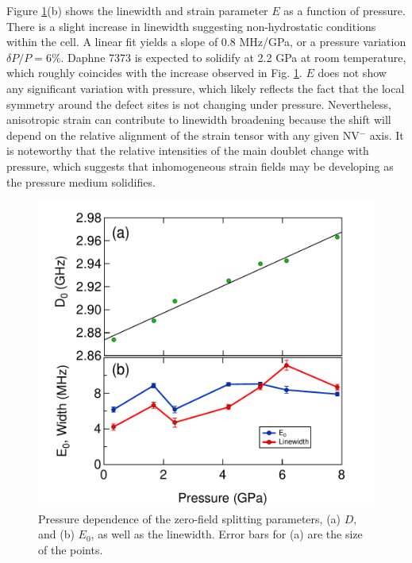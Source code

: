 \documentclass[%
 aip,
 sd,%
 amsmath,amssymb,
 reprint,%
 longbibliography
]{revtex4-1}
\begin{document}
Figure \ref{fig:parsVSpressure}(b) shows the linewidth and strain parameter $E$ as a function of pressure.  There is a slight increase in linewidth suggesting non-hydrostatic conditions within the cell.  A linear fit  yields a slope of 0.8 MHz/GPa, or a pressure variation $\delta P/P = 6\%$.     Daphne 7373 is expected to solidify at 2.2 GPa at room temperature, which roughly coincides with the increase observed in Fig. \ref{fig:parsVSpressure}.\cite{DaphneOilHighPressure}  $E$ does not show any significant variation with pressure, which likely reflects the fact that the local symmetry around the defect sites is not changing under pressure.\cite{NVcenterGroupTheoryAnalysis} Nevertheless, anisotropic strain  can contribute to linewidth broadening  because the shift will depend on the relative alignment of the strain tensor with any given NV$^-$ axis.  It is noteworthy that the relative intensities of the main doublet change with pressure, which suggests that inhomogeneous strain fields may be developing as the pressure medium solidifies.

\begin{figure}[!tb]
\includegraphics[width=\linewidth]{pars_VS_pressure}%
\caption{\label{fig:parsVSpressure} Pressure dependence of  the zero-field splitting parameters, (a) $D$, and (b) $E_0$, as well as the linewidth. Error bars for (a) are the size of the points.}
\end{figure}
\end{document}

